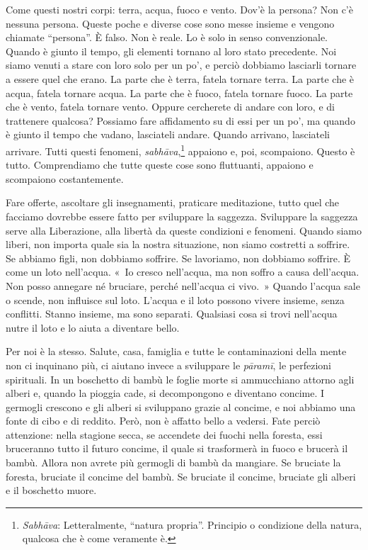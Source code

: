 Come questi nostri corpi: terra, acqua, fuoco e vento. Dov'è la persona?
Non c'è nessuna persona. Queste poche e diverse cose sono messe insieme
e vengono chiamate ``persona''. È falso. Non è reale. Lo è solo in senso
convenzionale. Quando è giunto il tempo, gli elementi tornano al loro
stato precedente. Noi siamo venuti a stare con loro solo per un po', e
perciò dobbiamo lasciarli tornare a essere quel che erano. La parte che
è terra, fatela tornare terra. La parte che è acqua, fatela tornare
acqua. La parte che è fuoco, fatela tornare fuoco. La parte che è vento,
fatela tornare vento. Oppure cercherete di andare con loro, e di
trattenere qualcosa? Possiamo fare affidamento su di essi per un po', ma
quando è giunto il tempo che vadano, lasciateli andare. Quando arrivano,
lasciateli arrivare. Tutti questi fenomeni, \emph{sabhāva},\footnote{\emph{Sabhāva}:
  Letteralmente, ``natura propria''. Principio o condizione della
  natura, qualcosa che è come veramente è.} appaiono e, poi, scompaiono.
Questo è tutto. Comprendiamo che tutte queste cose sono fluttuanti,
appaiono e scompaiono costantemente.

Fare offerte, ascoltare gli insegnamenti, praticare meditazione, tutto
quel che facciamo dovrebbe essere fatto per sviluppare la saggezza.
Sviluppare la saggezza serve alla Liberazione, alla libertà da queste
condizioni e fenomeni. Quando siamo liberi, non importa quale sia la
nostra situazione, non siamo costretti a soffrire. Se abbiamo figli, non
dobbiamo soffrire. Se lavoriamo, non dobbiamo soffrire. È come un loto
nell'acqua. «~Io cresco nell'acqua, ma non soffro a causa dell'acqua.
Non posso annegare né bruciare, perché nell'acqua ci vivo.~» Quando
l'acqua sale o scende, non influisce sul loto. L'acqua e il loto possono
vivere insieme, senza conflitti. Stanno insieme, ma sono separati.
Qualsiasi cosa si trovi nell'acqua nutre il loto e lo aiuta a diventare
bello.

Per noi è la stesso. Salute, casa, famiglia e tutte le contaminazioni
della mente non ci inquinano più, ci aiutano invece a sviluppare le
\emph{pāramī}, le perfezioni spirituali. In un boschetto di bambù le
foglie morte si ammucchiano attorno agli alberi e, quando la pioggia
cade, si decompongono e diventano concime. I germogli crescono e gli
alberi si sviluppano grazie al concime, e noi abbiamo una fonte di cibo
e di reddito. Però, non è affatto bello a vedersi. Fate perciò
attenzione: nella stagione secca, se accendete dei fuochi nella foresta,
essi bruceranno tutto il futuro concime, il quale si trasformerà in
fuoco e brucerà il bambù. Allora non avrete più germogli di bambù da
mangiare. Se bruciate la foresta, bruciate il concime del bambù. Se
bruciate il concime, bruciate gli alberi e il boschetto muore.

